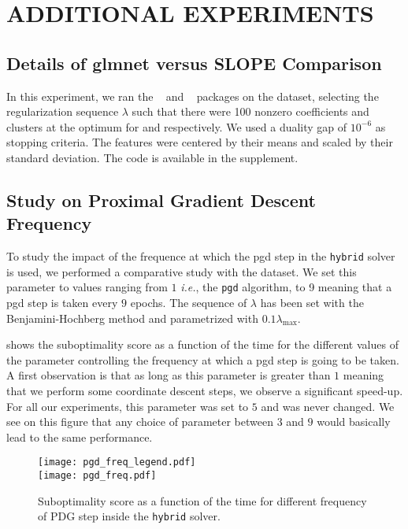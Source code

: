 \section{ADDITIONAL EXPERIMENTS}\label{sec:add_expes}

\subsection{Details of \textsf{glmnet} versus \textsf{SLOPE} Comparison}
\label{sec:slope-vs-glmnet}

In this experiment, we ran the ~\parencite{friedman2022} and ~\parencite{larsson2022d} packages on the  dataset, selecting the regularization sequence \(\lambda\) such that there were 100 nonzero coefficients and clusters at the optimum for  and  respectively.
We used a duality gap of \(10^{-6}\) as stopping criteria.
The features were centered by their means and scaled by their standard deviation.
The code is available in the supplement.

\subsection{Study on Proximal Gradient Descent Frequency}
\label{sec:pgd-freq-study}

To study the impact of the frequence at which the pgd step in the \texttt{hybrid} solver is used, we performed a comparative study with the  dataset.
We set this parameter to values ranging from $1$ \textit{i.e.}, the \texttt{pgd} algorithm, to 9 meaning that a pgd step is taken every $9$ epochs.
The sequence of $\lambda$ has been set with the Benjamini-Hochberg method and parametrized with $0.1 \lambda_{\text{max}}$.

 shows the suboptimality score as a function of the time for the different values of the parameter controlling the frequency at which a pgd step is going to be taken.
A first observation is that as long as this parameter is greater than $1$ meaning that we perform some coordinate descent steps, we observe a significant speed-up.
For all our experiments, this parameter was set to $5$ and was never changed.
We see on this figure that any choice of parameter between $3$ and $9$ would basically lead to the same performance.

\begin{figure*}[htb]
  \centering
  \texttt{[image: pgd\_freq\_legend.pdf]} \\
  \texttt{[image: pgd\_freq.pdf]}
  \caption{Suboptimality score as a function of the time for different frequency of PDG step inside the \texttt{hybrid} solver.}
  \label{fig:pgd_freq}
\end{figure*}

